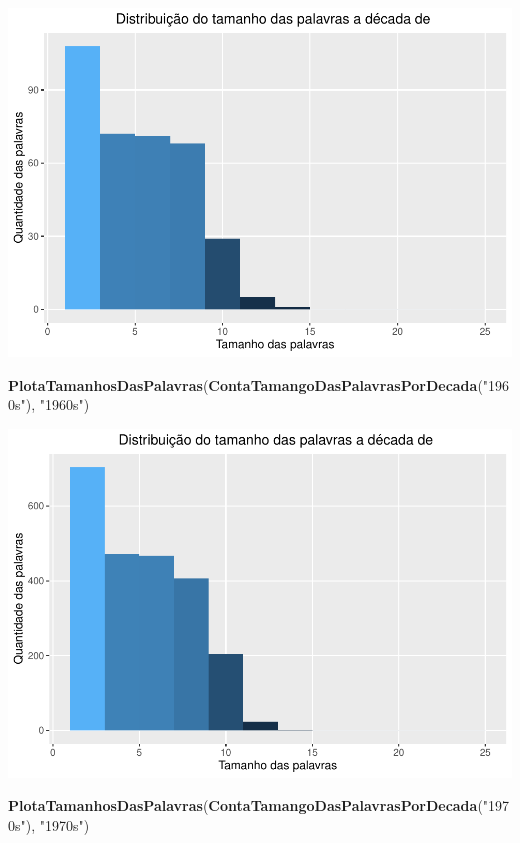 \documentclass[]{article}
\newenvironment{Shaded}{\begin{snugshade}}{\end{snugshade}}
\newcommand{\KeywordTok}[1]{\textcolor[rgb]{0.13,0.29,0.53}{\textbf{#1}}}
\newcommand{\NormalTok}[1]{#1}
\newcommand{\StringTok}[1]{\textcolor[rgb]{0.31,0.60,0.02}{#1}}
\begin{document}
\includegraphics{avaliacaoLetrasDeForro_files/figure-latex/unnamed-chunk-8-1.pdf}

\begin{Shaded}
\begin{Highlighting}[]
\KeywordTok{PlotaTamanhosDasPalavras}\NormalTok{(}\KeywordTok{ContaTamangoDasPalavrasPorDecada}\NormalTok{(}\StringTok{"1960s"}\NormalTok{), }\StringTok{"1960s"}\NormalTok{)}
\end{Highlighting}
\end{Shaded}

\includegraphics{avaliacaoLetrasDeForro_files/figure-latex/unnamed-chunk-8-2.pdf}

\begin{Shaded}
\begin{Highlighting}[]
\KeywordTok{PlotaTamanhosDasPalavras}\NormalTok{(}\KeywordTok{ContaTamangoDasPalavrasPorDecada}\NormalTok{(}\StringTok{"1970s"}\NormalTok{), }\StringTok{"1970s"}\NormalTok{)}
\end{Highlighting}
\end{Shaded}
\end{document}
